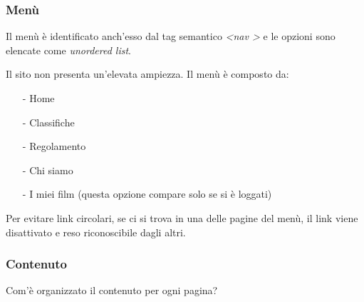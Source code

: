\documentclass[a4paper]{article}
\begin{document}
\subsubsection{Menù}
Il menù è identificato anch'esso dal tag semantico \textit{<nav
>} e le opzioni sono elencate come \textit{unordered list}.

Il sito non presenta un'elevata ampiezza. Il menù è composto da:

\begin{itemize}
    \item[-] Home
    \item[-] Classifiche
    \item[-] Regolamento
    \item[-] Chi siamo
    \item[-] I miei film (questa opzione compare solo se si è loggati) 
\end{itemize}

Per evitare link circolari, se ci si trova in una delle pagine del menù, il link viene disattivato e reso riconoscibile dagli altri.

\subsubsection{Contenuto}

Com'è organizzato il contenuto per ogni pagina?
\end{document}
